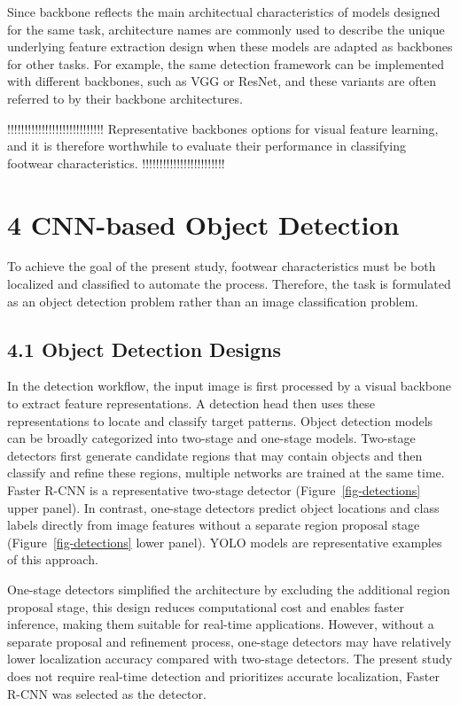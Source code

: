 \documentclass[
  letterpaper,
  DIV=11,
  numbers=noendperiod]{scrartcl}
\begin{document}
Since backbone reflects the main architectual characteristics of models
designed for the same task, architecture names are commonly used to
describe the unique underlying feature extraction design when these
models are adapted as backbones for other tasks. For example, the same
detection framework can be implemented with different backbones, such as
VGG or ResNet, and these variants are often referred to by their
backbone architectures.

!!!!!!!!!!!!!!!!!!!!!!!!!!!! Representative backbones options for visual
feature learning, and it is therefore worthwhile to evaluate their
performance in classifying footwear characteristics.
!!!!!!!!!!!!!!!!!!!!!!!!

\section{4 CNN-based Object Detection}\label{cnn-based-object-detection}

To achieve the goal of the present study, footwear characteristics must
be both localized and classified to automate the process. Therefore, the
task is formulated as an object detection problem rather than an image
classification problem.

\subsection{4.1 Object Detection
Designs}\label{object-detection-designs}

In the detection workflow, the input image is first processed by a
visual backbone to extract feature representations. A detection head
then uses these representations to locate and classify target patterns.
Object detection models can be broadly categorized into two-stage and
one-stage models. Two-stage detectors first generate candidate regions
that may contain objects and then classify and refine these regions,
multiple networks are trained at the same time. Faster R-CNN is a
representative two-stage detector (Figure~\ref{fig-detections} upper
panel). In contrast, one-stage detectors predict object locations and
class labels directly from image features without a separate region
proposal stage (Figure~\ref{fig-detections} lower panel). YOLO models
are representative examples of this approach.

One-stage detectors simplified the architecture by excluding the
additional region proposal stage, this design reduces computational cost
and enables faster inference, making them suitable for real-time
applications. However, without a separate proposal and refinement
process, one-stage detectors may have relatively lower localization
accuracy compared with two-stage detectors. The present study does not
require real-time detection and prioritizes accurate localization,
Faster R-CNN was selected as the detector.
\end{document}
